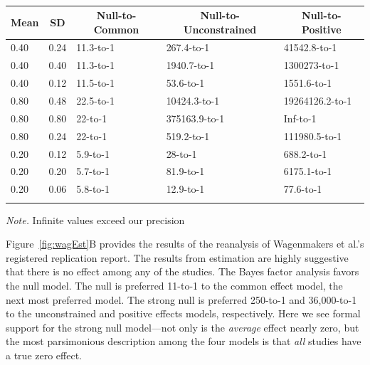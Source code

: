 \documentclass[english,man]{apa6}
\theoremstyle{definition}
\theoremstyle{definition}
\theoremstyle{remark}
\begin{document}
\begin{table}[tbp]
\begin{center}
\begin{threeparttable}
\caption{\label{tab:sens}}
\begin{tabular}{lllll}
\toprule
Mean & \multicolumn{1}{c}{SD} & \multicolumn{1}{c}{Null-to-Common} & \multicolumn{1}{c}{Null-to-Unconstrained} & \multicolumn{1}{c}{Null-to-Positive}\\
\midrule
0.40 & 0.24 & 11.3-to-1 & 267.4-to-1 & 41542.8-to-1\\
0.40 & 0.40 & 11.3-to-1 & 1940.7-to-1 & 1300273-to-1\\
0.40 & 0.12 & 11.5-to-1 & 53.6-to-1 & 1551.6-to-1\\
0.80 & 0.48 & 22.5-to-1 & 10424.3-to-1 & 19264126.2-to-1\\
0.80 & 0.80 & 22-to-1 & 375163.9-to-1 & Inf-to-1\\
0.80 & 0.24 & 22-to-1 & 519.2-to-1 & 111980.5-to-1\\
0.20 & 0.12 & 5.9-to-1 & 28-to-1 & 688.2-to-1\\
0.20 & 0.20 & 5.7-to-1 & 81.9-to-1 & 6175.1-to-1\\
0.20 & 0.06 & 5.8-to-1 & 12.9-to-1 & 77.6-to-1\\
\bottomrule
\addlinespace
\end{tabular}
\begin{tablenotes}[para]
\textit{Note.} Infinite values exceed our precision
\end{tablenotes}
\end{threeparttable}
\end{center}
\end{table}

Figure~\ref{fig:wagEst}B provides the results of the reanalysis of
Wagenmakers et al.'s registered replication report. The results from
estimation are highly suggestive that there is no effect among any of
the studies. The Bayes factor analysis favors the null model. The null
is preferred 11-to-1 to the common effect model, the next most preferred
model. The strong null is preferred 250-to-1 and 36,000-to-1 to the
unconstrained and positive effects models, respectively. Here we see
formal support for the strong null model---not only is the
\emph{average} effect nearly zero, but the most parsimonious description
among the four models is that \emph{all} studies have a true zero
effect.
\end{document}
